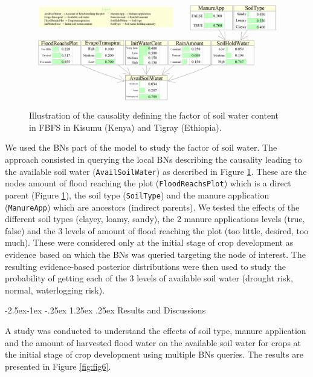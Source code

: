 \documentclass[12pt,oneside]{article}
\makeatletter
\renewcommand\paragraph{\@startsection{paragraph}{4}{\z@}%
            {-2.5ex\@plus -1ex \@minus -.25ex}%
            {1.25ex \@plus .25ex}%
            {\normalfont\normalsize\bfseries}}
\makeatother
\begin{document}
\begin{figure}[!htbp]

{\centering \includegraphics[width=1\linewidth,]{figures/Modelling_FBFS_Avail_soil_water} 

}

\caption{Illustration of the causality defining the factor of soil water content in FBFS in Kisumu (Kenya) and Tigray (Ethiopia).}\label{fig:fig5}
\end{figure}

We used the BNs part of the model to study the factor of soil water. The approach consisted in querying the local BNs describing the causality leading to the available soil water (\texttt{AvailSoilWater}) as described in Figure \ref{fig:fig5}. These are the nodes amount of flood reaching the plot (\texttt{FloodReachsPlot}) which is a direct parent (Figure \ref{fig:fig5}), the soil type (\texttt{SoilType}) and the manure application (\texttt{ManureApp}) which are ancestors (indirect parents). We tested the effects of the different soil types (clayey, loamy, sandy), the 2 manure applications levels (true, false) and the 3 levels of amount of flood reaching the plot (too little, desired, too much). These were considered only at the initial stage of crop development as evidence based on which the BNs was queried targeting the node of interest. The resulting evidence-based posterior distributions were then used to study the probability of getting each of the 3 levels of available soil water (drought risk, normal, waterlogging risk).

\hypertarget{IV213}{%
\paragraph{Results and Discussions}\label{IV213}}

A study was conducted to understand the effects of soil type, manure application and the amount of harvested flood water on the available soil water for crops at the initial stage of crop development using multiple BNs queries. The results are presented in Figure \ref{fig:fig6}.
\end{document}
